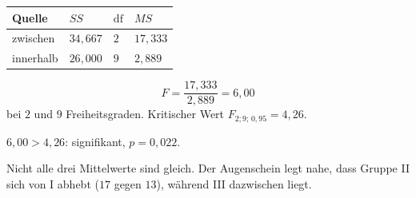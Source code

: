 \begin{aufgabe}
\begin{center}
\renewcommand{\arraystretch}{1.45}
\begin{tabular}{@{}P{2.2cm}P{1.8cm}P{1.4cm}P{1.8cm}@{}}
\toprule
\textbf{Quelle} & $SS$ & $\mathrm{df}$ & $MS$\\
\midrule
zwischen & $34{,}667$ & $2$ & $17{,}333$\\
innerhalb & $26{,}000$ & $9$ & $2{,}889$\\
\bottomrule
\end{tabular}
\end{center}

\[ F = \frac{17{,}333}{2{,}889} = 6{,}00 \]
bei $2$ und $9$ Freiheitsgraden. Kritischer Wert $F_{2;9;\,0{,}95} = 4{,}26$.

$6{,}00 > 4{,}26$: signifikant, $p = 0{,}022$.

Nicht alle drei Mittelwerte sind gleich. Der Augenschein legt nahe, dass Gruppe II sich von I abhebt ($17$ gegen $13$), während III dazwischen liegt.

\begin{center}
\begin{minipage}{0.86\textwidth}
\end{minipage}
\end{center}
\end{aufgabe}

